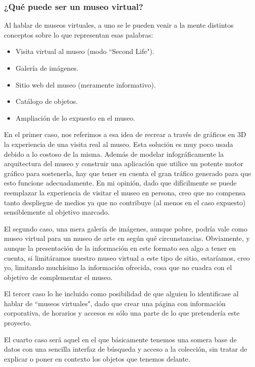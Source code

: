 \subsubsection{¿Qué puede ser un museo virtual?}
\par Al hablar de museos virtuales, a uno se le pueden venir a la mente distintos conceptos sobre lo que representan esas palabras:

\begin{itemize}
\item Visita virtual al museo (modo ``Second Life").
\item Galería de imágenes.
\item Sitio web del museo (meramente informativo).
\item Catálogo de objetos.
\item Ampliación de lo expuesto en el museo.
\end{itemize}

\par En el primer caso, nos referimos a esa idea de recrear a través de gráficos en 3D la experiencia de una visita real al museo. Esta solución es muy poco usada debido a lo costoso de la misma. Además de modelar infográficamente la arquitectura del museo y construir una aplicación que utilice un potente motor gráfico para sostenerla, hay que tener en cuenta el gran tráfico generado para que esto funcione adecuadamente. En mi opinión, dado que difícilmente se puede reemplazar la experiencia de visitar el museo en persona, creo que no compensa tanto despliegue de medios ya que no contribuye (al menos en el caso expuesto) sensiblemente al objetivo marcado.

\par El segundo caso, una mera galería de imágenes, aunque pobre, podría vale como museo virtual para un museo de arte en según qué circunstancias. Obviamente, y aunque la presentación de la información en este formato sea algo a tener en cuenta, si limitáramos nuestro museo virtual a este tipo de sitio, estaríamos, creo yo, limitando muchísimo la información ofrecida, cosa que no cuadra con el objetivo de complementar el museo.

\par El tercer caso lo he incluido como posibilidad de que alguien lo identificase al hablar de ``museos virtuales", dado que crear una página con información corporativa, de horarios y accesos es sólo una parte de lo que pretendería este proyecto.

\par El cuarto caso será aquel en el que básicamente tenemos una somera base de datos con una sencilla interfaz de búsqueda y acceso a la colección, sin tratar de explicar o poner en contexto los objetos que tenemos delante.

